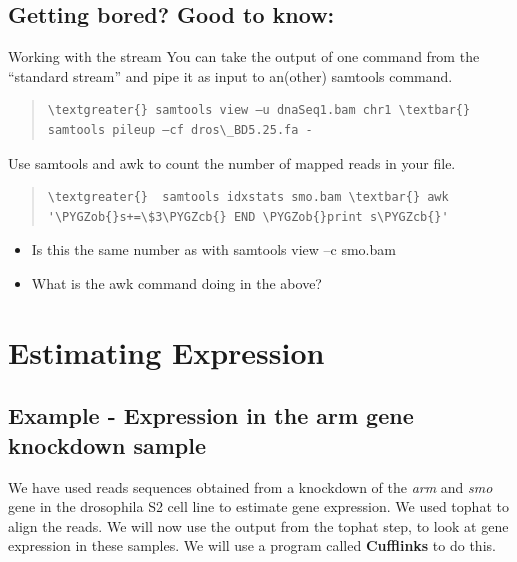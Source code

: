 \documentclass[letterpaper,10pt,english]{sphinxmanual}
\def\PYGZob{\char`\{}
\def\PYGZcb{\char`\}}
\begin{document}
\section{Getting bored? Good to know:}
\label{STEP3_viewManipulateAlignmentData_samtools:getting-bored-good-to-know}
Working with the stream
You can take the output of one command from the “standard stream” and pipe it as input to an(other) samtools command.
\begin{quote}

\begin{Verbatim}[commandchars=\\\{\}]
\textgreater{} samtools view –u dnaSeq1.bam chr1 \textbar{} samtools pileup –cf dros\_BD5.25.fa -
\end{Verbatim}
\end{quote}

Use samtools and awk to count the number of mapped reads in your file.
\begin{quote}

\begin{Verbatim}[commandchars=\\\{\}]
\textgreater{}  samtools idxstats smo.bam \textbar{} awk '\PYGZob{}s+=\$3\PYGZcb{} END \PYGZob{}print s\PYGZcb{}'
\end{Verbatim}
\end{quote}
\begin{itemize}
\item {} 
Is this the same number as with samtools view –c smo.bam

\item {} 
What is the awk command doing in the above?

\end{itemize}


\chapter{Estimating Expression}
\label{STEP4_CUFFLINKS_DE::doc}\label{STEP4_CUFFLINKS_DE:estimating-expression}

\section{Example - Expression in the arm gene knockdown sample}
\label{STEP4_CUFFLINKS_DE:example-expression-in-the-arm-gene-knockdown-sample}
We have used reads sequences obtained from a knockdown of the \emph{arm} and \emph{smo} gene in the drosophila S2 cell line to estimate gene expression. We used tophat to align the reads.  We will now use the output from the tophat step, to look at gene expression in these samples. We will use a program called \textbf{Cufflinks} to do this.
\end{document}

